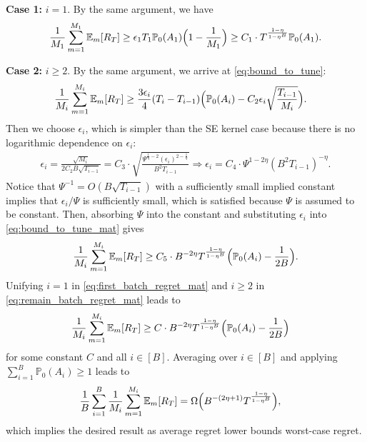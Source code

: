 \documentclass[10pt]{article}
\begin{document}
\textbf{Case 1:} $i=1$. By the same argument, we have
\begin{align}
    \frac{1}{M_1}\sum_{m=1}^{M_1}\mathbb{E}_m[R_T]
    \geq \epsilon_1 T_1 \mathbb{P}_0(A_1) \Bigl(1-\frac{1}{M_1}\Bigr)
    \geq C_1 \cdot T^{\frac{1-\eta}{1-\eta^B}}\mathbb{P}_0(A_1) \label{eq:first_batch_regret_mat}.
\end{align}

\textbf{Case 2:} $i\geq 2$. By the same argument, we arrive at \eqref{eq:bound_to_tune}:
\begin{align}
    \frac{1}{M_i}\sum_{m=1}^{M_i}\mathbb{E}_m[R_T]
    & \geq \frac{3\epsilon_i}{4}(T_i-T_{i-1}) \Bigl(\mathbb{P}_0(A_i)- C_2\epsilon_i  \sqrt{\frac{T_{i-1}}{M_i}}\Bigr). \label{eq:bound_to_tune_mat}
\end{align}
Then we choose $\epsilon_i$, which is simpler than the SE kernel case because there is no logarithmic dependence on $\epsilon_i$:
\begin{align}
    \epsilon_i 
    = \frac{\sqrt{M_i}}{2C_2B\sqrt{T_{i-1}}}
    = C_{3} \cdot \sqrt{\frac{\Psi^{\frac{1}{\eta}-2}(\epsilon_i)^{2-\frac{1}{\eta}}}{B^2T_{i-1}}}
    \Rightarrow
    \epsilon_i
    = C_{4} \cdot \Psi^{1-2\eta} (B^2T_{i-1})^{-\eta}.
\end{align}
Notice that $\Psi^{-1}=O(B\sqrt{T_{i-1}}) $ with a sufficiently small implied constant implies that $\epsilon_i/\Psi $ is sufficiently small, which is satisfied because $\Psi$ is assumed to be constant.
Then, absorbing $\Psi$ into the constant and substituting $\epsilon_i$ into \eqref{eq:bound_to_tune_mat} gives
\begin{align}
    \frac{1}{M_i}\sum_{m=1}^{M_i}\mathbb{E}_m[R_T]
    \geq C_{5} \cdot B^{-2\eta} T^{\frac{1-\eta}{1-\eta^B}} \Bigl(\mathbb{P}_0(A_i)-\frac{1}{2B}\Bigr) \label{eq:remain_batch_regret_mat}.
\end{align}
Unifying $i=1$ in \eqref{eq:first_batch_regret_mat} and $i\geq 2$ in \eqref{eq:remain_batch_regret_mat} leads to
\begin{align}
    \frac{1}{M_i}\sum_{m=1}^{M_i}\mathbb{E}_m[R_T]
    & \geq C \cdot B^{-2\eta} T^{\frac{1-\eta}{1-\eta^B}} \Bigl(\mathbb{P}_0(A_i)-\frac{1}{2B}\Bigr)
\end{align}
for some constant $C$ and all $i\in[B]$. Averaging over $i\in [B]$ and applying $\sum_{i=1}^B \mathbb{P}_0(A_i) \geq 1 $ leads to
\begin{align}
    \frac{1}{B}\sum_{i=1}^B \frac{1}{M_i}\sum_{m=1}^{M_i}\mathbb{E}_m[R_T]
    & = \Omega\Bigl(B^{-(2\eta+1)} T^{\frac{1-\eta}{1-\eta^B}} \Bigr),
\end{align}
which implies the desired result as average regret lower bounds worst-case regret.
\end{document}
